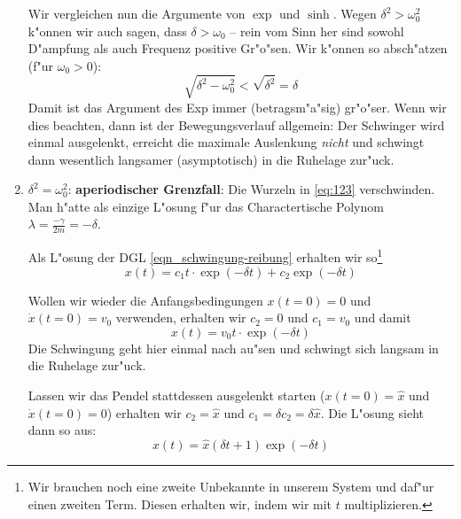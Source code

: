 \begin{enumerate}[F{a}ll I:]
   Wir vergleichen nun die Argumente von $\exp$ und $\sinh$. Wegen
    $\delta^2 > \omega_0^2$ k"onnen wir auch
   sagen, dass $\delta > \omega_0$ -- rein vom Sinn her sind sowohl
   D"ampfung als auch Frequenz positive Gr"o"sen. Wir k"onnen so
   absch"atzen (f"ur $\omega_0 > 0$):
   \begin{equation*}
      \sqrt{\delta^2 - \omega_0^2} < \sqrt{\delta^2} = \delta
   \end{equation*}
   Damit ist das Argument des Exp immer (betragsm"a"sig) gr"o"ser. Wenn
   wir dies beachten, dann ist der Bewegungsverlauf allgemein: Der
   Schwinger wird einmal ausgelenkt, erreicht die maximale Auslenkung
   \emph{nicht} und schwingt dann wesentlich langsamer (asymptotisch)
   in die Ruhelage zur"uck.



\item $\delta^2 = \omega_0^2$: \textbf{aperiodischer Grenzfall}: Die Wurzeln in
   \eqref{eq:123} verschwinden. Man h"atte als einzige L"osung f"ur
   das Charactertische Polynom $\lambda = \frac{- \gamma}{2m} =
   -\delta$.

   Als L"osung der DGL \eqref{eqn_schwingung-reibung} erhalten wir
   so\footnote{Wir brauchen noch eine zweite Unbekannte in unserem
     System und daf"ur einen zweiten Term. Diesen erhalten wir, indem
     wir mit $t$ multiplizieren.} 
   \begin{equation}
      \label{eq:130}
      x(t) = c_1 t \cdot \exp ( -\delta t) + c_2 \exp(-\delta t) 
   \end{equation}

   Wollen wir wieder die Anfangsbedingungen $x(t = 0) = 0$ und $\dot
   x(t = 0) = v_0$ verwenden, erhalten wir $c_2 = 0$ und $c_1 = v_0$
   und damit
\begin{equation}
   \label{eq:131}
   x(t) = v_0 t \cdot \exp( - \delta t)
\end{equation}
Die Schwingung geht hier einmal nach au"sen und schwingt sich langsam
in die Ruhelage zur"uck.

Lassen wir das Pendel stattdessen ausgelenkt starten ($x(t = 0) = \hat
x$ und $\dot x(t = 0) = 0$) erhalten wir $c_2 = \hat x$ und $c_1 =
\delta c_2 = \delta \hat x$. Die L"osung sieht dann so aus:
\begin{equation}
   \label{eqn_aperiod-grenzfall}
\boxed{   x(t) = \hat x (\delta t + 1) \exp(-\delta t)}
\end{equation}

\end{enumerate}

